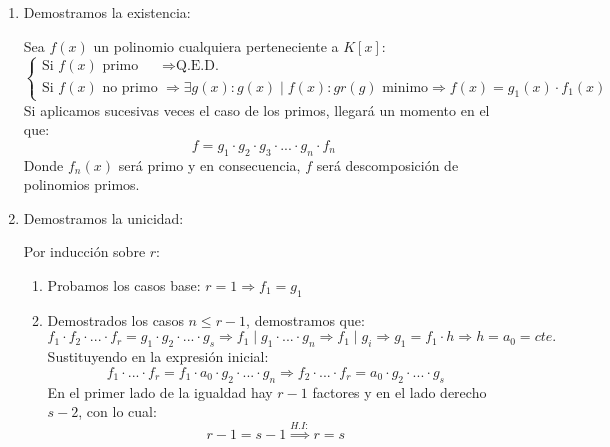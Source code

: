 \documentclass[10pt,a4paper,openright]{book}
\begin{document}
\begin{enumerate}
\item Demostramos la existencia:\par
Sea $f(x)$ un polinomio cualquiera perteneciente a $K[x]$:
$$
\begin{cases}
\mbox{Si }f(x)\mbox{ primo} & \Rightarrow \mbox{Q.E.D.} \\
\mbox{Si }f(x)\mbox{ no primo} & \Rightarrow \exists g(x): g(x)\mid f(x) : gr(g)\mbox{ minimo}\Rightarrow f(x)=g_1(x)\cdot f_1(x)
\end{cases}
$$
Si aplicamos sucesivas veces el caso de los primos, llegará un momento en el que:
$$f=g_1\cdot g_2\cdot g_3 \cdot ... \cdot g_n \cdot f_n$$
Donde $f_n(x)$ será primo y en consecuencia, $f$ será descomposición de polinomios primos.

\item Demostramos la unicidad:\par
Por inducción sobre $r$:
\begin{enumerate}
\item Probamos los casos base: $r=1\Rightarrow f_1=g_1$

\item Demostrados los casos $n\leq r-1$, demostramos que:
$$f_1\cdot f_2 \cdot ... \cdot f_r=g_1\cdot g_2 \cdot ... \cdot g_s \Rightarrow f_1\mid g_1\cdot ... \cdot g_n\Rightarrow f_1\mid g_i \Rightarrow g_1=f_1\cdot h \Rightarrow h=a_0=cte.$$
Sustituyendo en la expresión inicial:
$$f_1\cdot ... \cdot f_r=f_1\cdot a_0\cdot g_2\cdot ... \cdot g_n\Rightarrow f_2\cdot ... \cdot f_r=a_0\cdot g_2\cdot ... \cdot g_s$$
En el primer lado de la igualdad hay $r-1$ factores y en el lado derecho $s-2$, con lo cual:
$$r-1=s-1\stackrel{H.I:}{\Rightarrow }r=s$$
\end{enumerate}
\end{enumerate}
\end{document}
